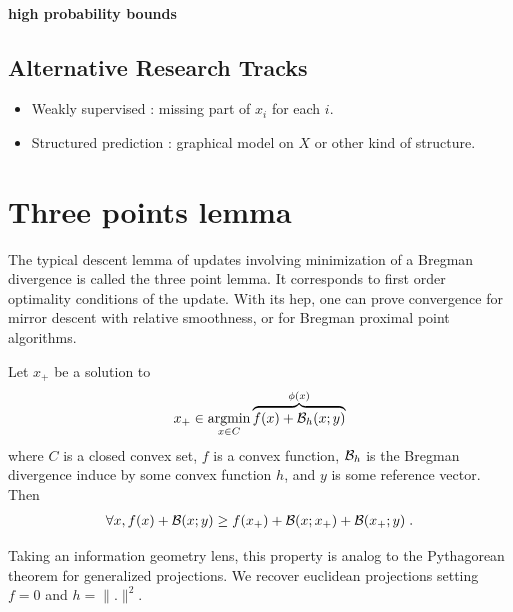 \documentclass{article}
\begin{document}
\paragraph{high probability bounds}


\subsection{Alternative Research Tracks}
\begin{itemize}
	\item Weakly supervised : missing part of $x_i$ for each $i$.
	\item Structured prediction : graphical model on $X$ or other kind of structure.
\end{itemize}







\newpage
\appendix

\section{Three points lemma}
\label{app:3points}

The typical descent lemma of updates involving minimization of a Bregman divergence is called the three point lemma. 
It corresponds to first order optimality conditions of the update.
With its hep, one can prove convergence for mirror descent with relative smoothness, or for Bregman proximal point algorithms.

\begin{lemma}
Let $x_+$ be a solution to 
\begin{align}
	x_+ \in \operatorname*{argmin}	_{x\in C} \overbrace{f(x) + {\mathcal B}_h(x ; y)}^{\phi(x)}
\end{align}
where $C$ is a closed convex set, $f$ is a convex function, ${\mathcal B}_h$ is the Bregman divergence induce by some convex function $h$, and $y$ is some reference vector. Then 
\begin{align}
	\forall x, f(x) + {\mathcal B}(x ;y) \geq f(x_+) + {\mathcal B}(x ; x_+) +{\mathcal B}(x_+ ; y) \; .
\end{align}
\end{lemma}

Taking an information geometry lens, this property is analog to the Pythagorean theorem for generalized projections.
We recover euclidean projections setting $f=0$ and $h=\|.\|^2$.
\end{document}
